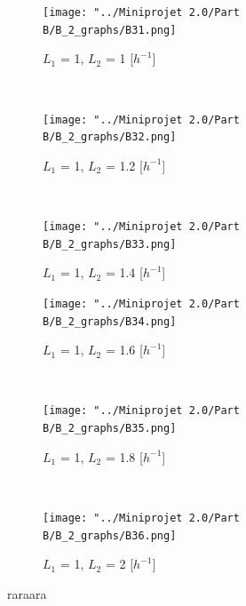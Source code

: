 \documentclass[10pt,a4paper,oneside,twocolumn]{article}
\numberwithin{equation}{section} %
\begin{document}
    \begin{figure}
    \centering
	\begin{subfigure}[b]{0.32\textwidth}
	    \texttt{[image: "../Miniprojet 2.0/Part B/B\_2\_graphs/B31.png]}
	    \caption{$L_1$ = 1, $L_2$ = 1 [$h^{-1}$]}
	\end{subfigure}
	~ 
	\begin{subfigure}[b]{0.32\textwidth}
	    \texttt{[image: "../Miniprojet 2.0/Part B/B\_2\_graphs/B32.png]}
	    \caption{$L_1$ = 1, $L_2$ = 1.2 [$h^{-1}$]}
	\end{subfigure}
	~ 
	\begin{subfigure}[b]{0.32\textwidth}
	    \texttt{[image: "../Miniprojet 2.0/Part B/B\_2\_graphs/B33.png]}
	    \caption{$L_1$ = 1, $L_2$ = 1.4 [$h^{-1}$]}
	\end{subfigure}
	 
	\begin{subfigure}[b]{0.32\textwidth}
	    \texttt{[image: "../Miniprojet 2.0/Part B/B\_2\_graphs/B34.png]}
	    \caption{$L_1$ = 1, $L_2$ = 1.6 [$h^{-1}$]}
	\end{subfigure}
	~ 
	\begin{subfigure}[b]{0.32\textwidth}
	    \texttt{[image: "../Miniprojet 2.0/Part B/B\_2\_graphs/B35.png]}
	    \caption{$L_1$ = 1, $L_2$ = 1.8 [$h^{-1}$]}
	\end{subfigure}
	~ 
	\begin{subfigure}[b]{0.32\textwidth}
	    \texttt{[image: "../Miniprojet 2.0/Part B/B\_2\_graphs/B36.png]}
	    \caption{$L_1$ = 1, $L_2$ = 2 [$h^{-1}$]}
	\end{subfigure}

	\caption{raraara}
    \end{figure}
\end{document}
